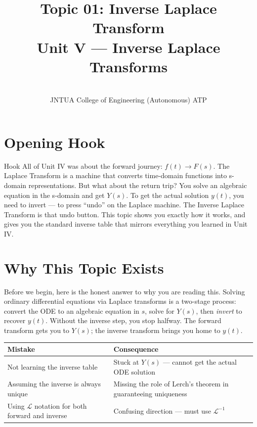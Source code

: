\documentclass[12pt,a4paper]{article}
\title{Topic 01: Inverse Laplace Transform \\ \large Unit V --- Inverse Laplace Transforms}
\author{\\
JNTUA College of Engineering (Autonomous) ATP}
\date{}
\begin{document}
\maketitle
\tableofcontents
\newpage

\section{Opening Hook}

\begin{curiositybox}{Hook}
All of Unit IV was about the forward journey: $f(t) \to F(s)$.
The Laplace Transform is a machine that converts time-domain functions into
s-domain representations. But what about the return trip? You solve an
algebraic equation in the s-domain and get $Y(s)$. To get the actual solution
$y(t)$, you need to invert --- to press ``undo'' on the Laplace machine.
The Inverse Laplace Transform is that undo button. This topic shows you
exactly how it works, and gives you the standard inverse table that mirrors
everything you learned in Unit IV.
\end{curiositybox}

\section{Why This Topic Exists}

Before we begin, here is the honest answer to why you are reading this.
Solving ordinary differential equations via Laplace transforms is a
two-stage process: convert the ODE to an algebraic equation in $s$, solve for
$Y(s)$, then \emph{invert} to recover $y(t)$. Without the inverse step, you
stop halfway. The forward transform gets you to $Y(s)$; the inverse transform
brings you home to $y(t)$.

\vspace{6pt}
\begin{center}
\begin{tabular}{@{}p{7cm}p{7cm}@{}}
\toprule
\textbf{Mistake} & \textbf{Consequence} \\
\midrule
Not learning the inverse table &
  Stuck at $Y(s)$ --- cannot get the actual ODE solution \\
\addlinespace
Assuming the inverse is always unique &
  Missing the role of Lerch's theorem in guaranteeing uniqueness \\
\addlinespace
Using $\mathcal{L}$ notation for both forward and inverse &
  Confusing direction --- must use $\mathcal{L}^{-1}$ \\
\bottomrule
\end{tabular}
\end{center}
\end{document}
